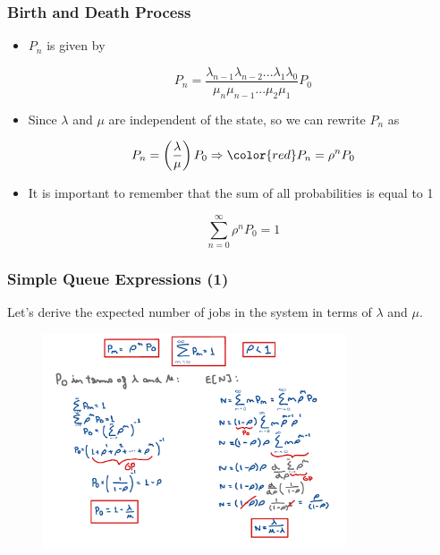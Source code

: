 \begin{frame}
    \frametitle{Birth and Death Process}
    \begin{itemize}

        \item $P_n$ is given by

        $$P_n = \frac{\lambda_{n-1}\lambda_{n-2}...\lambda_{1}\lambda_{0}}{\mu_{n}\mu_{n-1}...\mu_{2}\mu_{1}}P_0$$

        \item Since $\lambda$ and $\mu$ are independent of the state, so we can rewrite $P_n$ as 

        $$P_n = \left(\frac{\lambda}{\mu}\right)P_0 \Rightarrow {\color{red}P_n = \rho^n P_0}$$

        \item It is important to remember that the sum of all probabilities is equal to 1

        $$\sum_{n=0}^{\infty}\rho^n P_0 = 1$$

    \end{itemize}
\end{frame}

\begin{frame}
    \frametitle{Simple Queue Expressions (1)}
    Let's derive the expected number of jobs in the system in 
    terms of $\lambda$ and $\mu$.

    \begin{figure}
        \centering
        \includegraphics[width=0.8\textwidth]{slides/figures/simple_queue_expected_n.pdf}
    \end{figure}
\end{frame}


